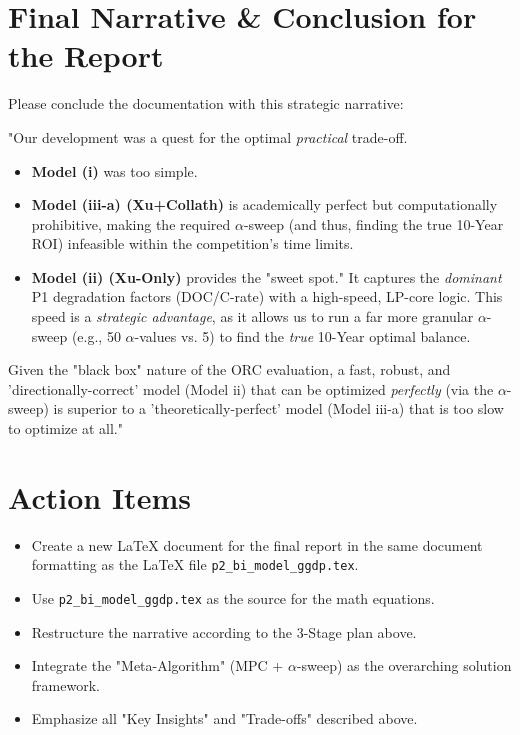 \documentclass[11pt, a4paper]{article}
\begin{document}
\section{Final Narrative \& Conclusion for the Report}
Please conclude the documentation with this strategic narrative:

"Our development was a quest for the optimal \emph{practical} trade-off.
\begin{itemize}
    \item \textbf{Model (i)} was too simple.
    \item \textbf{Model (iii-a) (Xu+Collath)} is academically perfect but computationally prohibitive, making the required $\alpha$-sweep (and thus, finding the true 10-Year ROI) infeasible within the competition's time limits.
    \item \textbf{Model (ii) (Xu-Only)} provides the "sweet spot." It captures the \emph{dominant} P1 degradation factors (DOC/C-rate) with a high-speed, LP-core logic. This speed is a \emph{strategic advantage}, as it allows us to run a far more granular $\alpha$-sweep (e.g., 50 $\alpha$-values vs. 5) to find the \emph{true} 10-Year optimal balance.
\end{itemize}

Given the "black box" nature of the ORC evaluation, a fast, robust, and 'directionally-correct' model (Model ii) that can be optimized \emph{perfectly} (via the $\alpha$-sweep) is superior to a 'theoretically-perfect' model (Model iii-a) that is too slow to optimize at all."

\section{Action Items}
\begin{itemize}
    \item[$\square$] Create a new LaTeX document for the final report in the same document formatting as the LaTeX file \texttt{p2\_bi\_model\_ggdp.tex}.
    \item[$\square$] Use \texttt{p2\_bi\_model\_ggdp.tex} as the source for the math equations.
    \item[$\square$] Restructure the narrative according to the 3-Stage plan above.
    \item[$\square$] Integrate the "Meta-Algorithm" (MPC + $\alpha$-sweep) as the overarching solution framework.
    \item[$\square$] Emphasize all "Key Insights" and "Trade-offs" described above.
\end{itemize}
\end{document}
